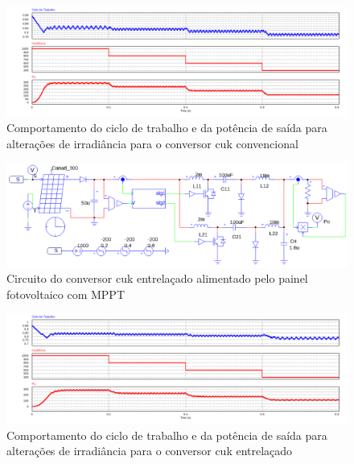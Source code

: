 \documentclass[
	12pt,				%
	openany,
	onseside,
	a4paper,			%
	english,			%
	french,				%
	spanish,			%
	brazil,				%
	]{abntex2}
\begin{document}
\begin{figure}[htb]%
	\captionsetup{justification=centering}%
	\begin{center}%
		\includegraphics[width= \textwidth]{mppt_conv_data}
		\caption{Comportamento do ciclo de trabalho e da potência de saída para alterações de irradiância para o conversor cuk convencional}
		\label{fig:mppt_conv_data}
	\end{center}
\end{figure}

\begin{figure}[htb]%
	\captionsetup{justification=centering}%
	\begin{center}%
		\includegraphics[width= \linewidth]{mppt_interv_circ}
		\caption{Circuito do conversor cuk entrelaçado alimentado pelo painel fotovoltaico com MPPT}
		\label{fig:mppt_interv_circ}
	\end{center}
\end{figure}

\begin{figure}[htb]%
	\captionsetup{justification=centering}%
	\begin{center}%
		\includegraphics[width= \textwidth]{mppt_interv_data}
		\caption{Comportamento do ciclo de trabalho e da potência de saída para alterações de irradiância para o conversor cuk entrelaçado}
		\label{fig:mppt_interv_data}
	\end{center}
\end{figure}
\end{document}
